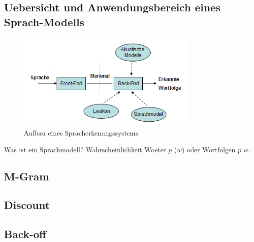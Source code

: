 \subsection{Uebersicht und Anwendungsbereich eines Sprach-Modells}


\begin{figure}[htbp]
\includegraphics[width=3.5in]{Images/spracherkennungsystem}
\caption{\label{spracherkennungsystem}Aufbau eines Spracherkenungssystems}
\end{figure}


Was ist ein Sprachmodell? 
Wahrscheinlichkeit Woeter $p$ ($w$) oder Wortfolgen $p$ $w$.
\subsection{M-Gram}
\subsection{Discount}
\subsection{Back-off}